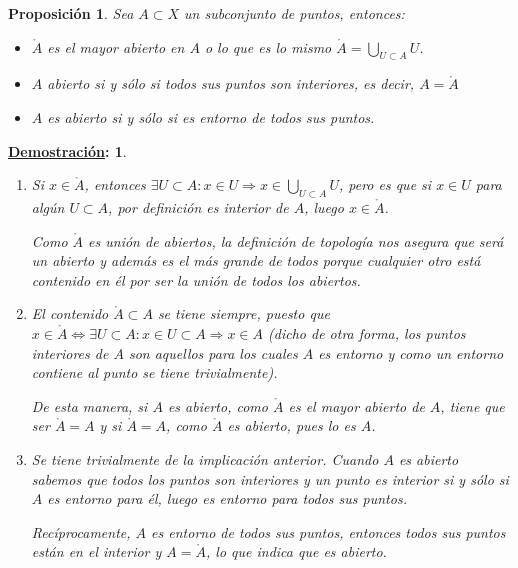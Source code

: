 \documentclass[10pt,a4paper,openright]{book}
\theoremstyle{break}
\newtheorem*{prop}{Proposición}
\newtheorem*{demo}{\underline{Demostración}:}
\begin{document}
\begin{prop}
Sea $A\subset X$ un subconjunto de puntos, entonces:
\begin{itemize}
\item $\mathring{A}$ es el mayor abierto en $A$ o lo que es lo mismo $ \mathring{A} = \bigcup_{U \subset A} U$.
\item $A$ abierto si y sólo si todos sus puntos son interiores, es decir, $A = \mathring{A}$
\item $A$ es abierto si y sólo si es entorno de todos sus puntos.
\end{itemize}
\end{prop}
\begin{demo}
\begin{enumerate}
    \item Si $x\in \mathring{A}$, entonces $\exists U \subset A : x\in U \Rightarrow x\in \bigcup_{U\subset A}U$, pero es que si $x\in U$ para algún $U\subset A$, por definición es interior de $A$, luego $x\in \mathring{A}$.
   
   Como $\mathring{A}$ es unión de abiertos, la definición de topología nos asegura que será un abierto y además es el más grande de todos porque cualquier otro está contenido en él por ser la unión de todos los abiertos.   
   \item El contenido $\mathring{A}\subset A$ se tiene siempre, puesto que $x\in \mathring{A}\Leftrightarrow \exists U \subset A : x\in U \subset A \Rightarrow x\in A$ (dicho de otra forma, los puntos interiores de $A$ son aquellos para los cuales $A$ es entorno y como un entorno contiene al punto se tiene trivialmente).
   
   De esta manera, si $A$ es abierto, como $\mathring{A}$ es el mayor abierto de $A$, tiene que ser $\mathring{A} = A$ y si $\mathring{A} = A$, como $\mathring{A}$ es abierto, pues lo es $A$.
    
   \item Se tiene trivialmente de la implicación anterior. Cuando $A$ es abierto sabemos que todos los puntos son interiores y un punto es interior si y sólo si $A$ es entorno para él, luego es entorno para todos sus puntos.
   
   Recíprocamente, $A$ es entorno de todos sus puntos, entonces todos sus puntos están en el interior y $A = \mathring{A}$, lo que indica que es abierto.
\end{enumerate}
\end{demo}
\end{document}
